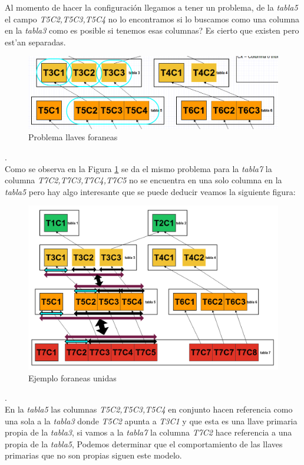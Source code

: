 Al momento de hacer la configuraci\'on llegamos a tener un problema, de la \textit{tabla5} el campo  \textit{T5C2,T5C3,T5C4} no lo encontramos si lo buscamos como una columna en la \textit{tabla3} como es posible si tenemos esas columnas? Es cierto que existen pero est'an separadas.\\
\begin{figure}[hbtp]
\centering
\includegraphics[scale=0.4]{images/problemaColumnas.png}
\caption{Problema llaves foraneas}\label{fig:problemaColumnasForaneasLine}
\end{figure}.\\
Como se observa en la Figura \ref{fig:problemaColumnasForaneasLine} se da el mismo problema para la \textit{tabla7} la columna \textit{T7C2,T7C3,T7C4,T7C5} no se encuentra en una solo columna en la \textit{tabla5} pero hay algo interesante que se puede deducir veamos la siguiente figura:\\
\begin{figure}[hbtp]
\centering
\includegraphics[scale=0.3]{images/problemaForaneas.png}
\caption{Ejemplo foraneas unidas}\label{fig:problemaColumnasForaneasGrafica}
\end{figure}.\\
En la \textit{tabla5} las columnas \textit{T5C2,T5C3,T5C4} en conjunto hacen referencia como una sola a la \textit{tabla3} donde \textit{T5C2} apunta a \textit{T3C1} y que esta es una llave primaria propia de la \textit{tabla3}, si vamos a la \textit{tabla7} la columna  \textit{T7C2} hace referencia a una propia de la \textit{tabla5}, Podemos determinar que el comportamiento de las llaves primarias que no son propias siguen este modelo.
